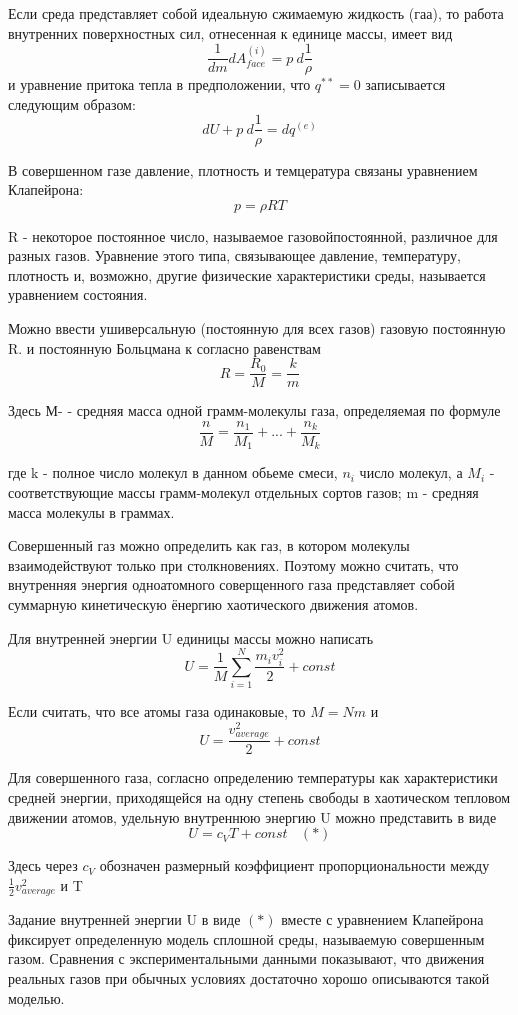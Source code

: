 Если среда представляет собой идеальную сжимаемую жидкость (гаа), то работа внутренних поверхностных сил, отнесенная к единице массы, имеет вид
$$ \frac{1}{dm}dA_{face}^{(i)} = p\ d\frac{1}{\rho} $$
и уравнение притока тепла в предположении, что $q^{**} = 0$ записывается следующим образом:
$$ dU + p\ d\frac{1}{\rho} = dq^{(e)} $$

В совершенном газе давление, плотность и темцература связаны уравнением Клапейрона:
$$ p = \rho R T $$

R - некоторое постоянное число, называемое газовойпостоянной, различное для разных газов. Уравнение этого типа, связывающее давление, температуру, плотность и, возможно, другие физические характеристики среды, называется уравнением состояния.

Можно ввести ушиверсальную (постоянную для всех газов) газовую постоянную R. и постоянную Больцмана к согласно равенствам
$$ R = \frac{R_0}{M} = \frac{k}{m} $$

Здесь М- - средняя масса одной грамм-молекулы газа, определяемая по формуле
$$ \frac{n}{M} = \frac{n_1}{M_1} + ... + \frac{n_k}{M_k} $$

где k - полное число молекул в данном обьеме смеси,  $n_i$ число молекул, а $M_i$ - соответствующие массы грамм-молекул отдельных сортов газов; m - средняя масса молекулы в граммах.

Совершенный газ можно определить как газ, в котором молекулы взаимодействуют только при столкновениях. Поэтому можно считать, что внутренняя энергия одноатомного соверщенного газа представляет собой суммарную кинетическую ёнергию хаотического движения атомов. 

Для внутренней энергии U единицы массы можно написать
$$ U = \frac{1}{M}\sum\limits_{i=1}^{N}\frac{m_iv_i^2}{2} + const $$

Если считать, что все атомы газа одинаковые, то $M = Nm$ и 
$$ U = \frac{v_{average}^2}{2} + const $$

Для совершенного газа, согласно определению температуры как характеристики средней энергии, приходящейся на одну степень свободы в хаотическом тепловом движении атомов, удельную внутреннюю энергию U можно представить в виде
$$ U = c_VT + const \ \ \ \ (*)$$

Здесь через $c_V$ обозначен размерный коэффициент пропорциональности между $\frac{1}{2}v_{average}^2$ и T

Задание внутренней энергии U в виде $(*)$ вместе с уравнением Клапейрона фиксирует определенную модель сплошной среды, называемую совершенным газом. Сравнения с экспериментальными данными показывают, что движения реальных газов при обычных условиях достаточно хорошо описываются такой моделью.

